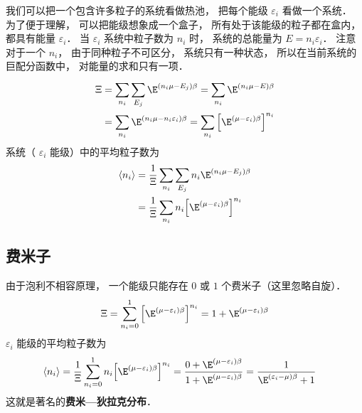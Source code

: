 
我们可以把一个包含许多粒子的系统看做热池， 把每个能级 ${\varepsilon _i}$ 看做一个系统． 为了便于理解， 可以把能级想象成一个盒子， 所有处于该能级的粒子都在盒内， 都具有能量 ${\varepsilon _i}$．  当 ${\varepsilon _i}$ 系统中粒子数为 ${n_i}$ 时， 系统的总能量为 $E = {n_i}{\varepsilon _i}$．  注意对于一个 ${n_i}$，  由于同种粒子不可区分， 系统只有一种状态， 所以在当前系统的巨配分函数中， 对能量的求和只有一项．
\begin{equation}
  \begin{aligned}
  \Xi & = \sum\limits_{{n_i}}^{} {\sum\limits_{{E_j}}^{} {{\E^{\left( {{n_i}\mu  - {E_j}} \right)\beta }}} }  = \sum\limits_{{n_i}}^{} {{\E^{\left( {{n_i}\mu  - E} \right)\beta }}}  \\
  & = \sum\limits_{{n_i}}^{} {{\E^{\left( {{n_i}\mu  - {n_i}{\varepsilon _i}} \right)\beta }}}  = \sum\limits_{{n_i}}^{} {{{\left[ {{\E^{\left( {\mu  - {\varepsilon _i}} \right)\beta }}} \right]}^{{n_i}}}}
  \end{aligned}
\end{equation}
系统（ ${\varepsilon _i}$ 能级）中的平均粒子数为
\begin{equation}
\begin{aligned}
  \left\langle {{n_i}} \right\rangle  & = \frac{1}{\Xi }\sum\limits_{{n_i}}^{} {\sum\limits_{{E_j}}^{} {{n_i}{\E^{\left( {{n_i}\mu  - {E_j}} \right)\beta }}} }  \\
  & = \frac{1}{\Xi }\sum\limits_{{n_i}}^{} {{n_i}{{\left[ {{\E^{\left( {\mu  - {\varepsilon _i}} \right)\beta }}} \right]}^{{n_i}}}}
\end{aligned}
\end{equation}
\subsection{费米子}
由于泡利不相容原理， 一个能级只能存在 $0$ 或 $1$ 个费米子（这里忽略自旋）．
\begin{equation}
  \Xi  = \sum\limits_{{n_i} = 0}^1 {{{\left[ {{\E^{\left( {\mu  - {\varepsilon _i}} \right)\beta }}} \right]}^{{n_i}}}}  = 1 + {\E^{\left( {\mu  - {\varepsilon _i}} \right)\beta }}
\end{equation}
 ${\varepsilon _i}$ 能级的平均粒子数为
\begin{equation}
\begin{aligned}
\left\langle {{n_i}} \right\rangle & = \frac{1}{\Xi }\sum\limits_{{n_i} = 0}^1 {{n_i}{{\left[ {{\E^{\left( {\mu  - {\varepsilon _i}} \right)\beta }}} \right]}^{{n_i}}}} = \frac{{0 + {\E^{\left( {\mu  - {\varepsilon _i}} \right)\beta }}}}{{1 + {\E^{\left( {\mu  - {\varepsilon _i}} \right)\beta }}}}  = \frac{1}{{{\E^{\left( {{\varepsilon _i} - \mu } \right)\beta }} + 1}}
\end{aligned}
\end{equation}
  这就是著名的\textbf{费米—狄拉克分布}．
